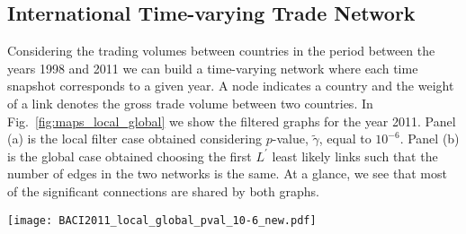 \documentclass[aps,twocolumn,superscriptaddress]{revtex4-1}
\begin{document}
\subsection{International Time-varying Trade Network}

Considering the trading volumes between countries in the period between the years 1998 and 2011 we can build a time-varying network where each time snapshot corresponds to a given year. A node indicates a country and the weight of a link denotes the gross trade volume between two countries. In Fig.~\ref{fig:maps_local_global} we show the filtered graphs for the year 2011. Panel (a) is the local filter case obtained considering $p$-value, $\widetilde{\gamma}$, equal to $10^{-6}$. Panel (b) is the global case obtained choosing the first $ L^{\prime} $ least likely links such that the number of edges in the two networks is the same. At a glance, we see that most of the significant connections are shared by both graphs.

%
%
%
\begin{figure*}[hb!]
\centering
%
\texttt{[image: BACI2011\_local\_global\_pval\_10-6\_new.pdf]}
%
\caption{2011 World Trade Networks filtered using local (a) and global (b) ECM filters. The local network is obtained using $\widetilde{\gamma} = 10^{-6}$. The number of links, $L$, in both graphs is 149. The size of the nodes is proportional to their degree.}
\label{fig:maps_local_global}
\end{figure*}
%
\end{document}
